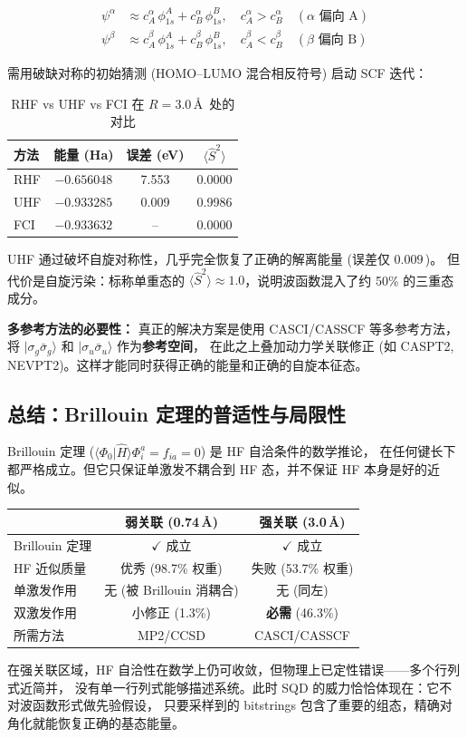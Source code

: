 \documentclass[fontset=mac]{ctexart}
\newcommand{\ket}[1]{|#1\rangle}
\newcommand{\braket}[2]{\langle #1|#2\rangle}
\begin{document}
\begin{align}
    \psi^\alpha &\approx c_A^\alpha\,\phi_{1s}^A + c_B^\alpha\,\phi_{1s}^B, \quad c_A^\alpha > c_B^\alpha \quad (\alpha\text{ 偏向 A}) \\
    \psi^\beta  &\approx c_A^\beta\,\phi_{1s}^A + c_B^\beta\,\phi_{1s}^B, \quad c_A^\beta < c_B^\beta \quad (\beta\text{ 偏向 B})
\end{align}

需用破缺对称的初始猜测 (HOMO--LUMO 混合相反符号) 启动 SCF 迭代：

\begin{table}[H]
\centering
\begin{tabular}{lccc}
\toprule
\textbf{方法} & \textbf{能量 (Ha)} & \textbf{误差 (eV)} & \textbf{$\langle\hat{S}^2\rangle$} \\
\midrule
RHF & $-0.656048$ & 7.553 & 0.0000 \\
UHF & $-0.933285$ & 0.009 & 0.9986 \\
FCI & $-0.933632$ & -- & 0.0000 \\
\bottomrule
\end{tabular}
\caption{RHF vs UHF vs FCI 在 $R=3.0$\,\AA\, 处的对比}
\end{table}

UHF 通过破坏自旋对称性，几乎完全恢复了正确的解离能量 (误差仅 $0.009$\,)。
但代价是自旋污染：标称单重态的 $\langle\hat{S}^2\rangle \approx 1.0$，说明波函数混入了约 50\% 的三重态成分。

\textbf{多参考方法的必要性：} 真正的解决方案是使用 CASCI/CASSCF 等多参考方法，
将 $\ket{\sigma_g\bar{\sigma}_g}$ 和 $\ket{\sigma_u\bar{\sigma}_u}$ 作为\textbf{参考空间}，
在此之上叠加动力学关联修正 (如 CASPT2, NEVPT2)。这样才能同时获得正确的能量和正确的自旋本征态。

\subsection*{总结：Brillouin 定理的普适性与局限性}

Brillouin 定理 ($\braket{\Phi_0}{\hat{H}}{\Phi_i^a}=f_{ia}=0$) 是 HF 自洽条件的数学推论，
在任何键长下都严格成立。但它只保证单激发不耦合到 HF 态，并不保证 HF 本身是好的近似。

\begin{center}
\begin{tabular}{lcc}
\toprule
& \textbf{弱关联 (0.74\,\AA)} & \textbf{强关联 (3.0\,\AA)} \\
\midrule
Brillouin 定理 & $\checkmark$ 成立 & $\checkmark$ 成立 \\
HF 近似质量 & 优秀 (98.7\% 权重) & 失败 (53.7\% 权重) \\
单激发作用 & 无 (被 Brillouin 消耦合) & 无 (同左) \\
双激发作用 & 小修正 (1.3\%) & \textbf{必需} (46.3\%) \\
所需方法 & MP2/CCSD & CASCI/CASSCF \\
\bottomrule
\end{tabular}
\end{center}

在强关联区域，HF 自洽性在数学上仍可收敛，但物理上已定性错误——多个行列式近简并，
没有单一行列式能够描述系统。此时 SQD 的威力恰恰体现在：它不对波函数形式做先验假设，
只要采样到的 bitstrings 包含了重要的组态，精确对角化就能恢复正确的基态能量。
\end{document}
